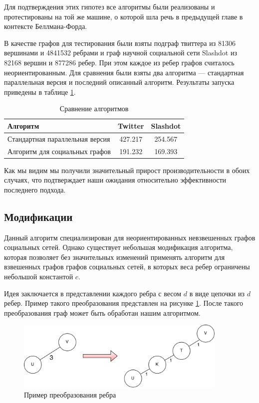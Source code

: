 Для подтверждения этих гипотез все алгоритмы были реализованы и протестированы на той же машине, о которой шла речь в предыдущей главе в контексте Беллмана-Форда.

В качестве графов для тестирования были взяты подграф твиттера из 81306 вершинами и 4841532 ребрами и граф научной социальной сети Slashdot из 82168 вершин и 877286 ребер. При этом каждое из ребер графов считалось неориентированным. Для сравнения были взяты два алгоритма --- стандартная параллельная версия и последний описанный алгоритм. Результаты запуска приведены в таблице \ref{table:algo_floyd_comparison}.   


\FloatBarrier
\begin{table}[H]
\centering

\begin{tabular}{l|c|c}  
Алгоритм & Twitter & Slashdot\\
\hline\hline
Стандартная параллельная версия & 427.217 & 254.567 \\  
Алгоритм для социальных графов & 191.232 & 169.393  \\
\hline
\end{tabular}

\caption{Сравнение алгоритмов}
\label {table:algo_floyd_comparison}
\end{table}
\FloatBarrier

Как мы видим мы получили значительный прирост производительности в обоих случаях, что подтверждает наши ожидания относительно эффективности последнего подхода.

\FloatBarrier
\subsection{Модификации}

Данный алгоритм специализирован для неориентированных невзвешенных графов социальных сетей. Однако существует небольшая модификация алгоритма, которая позволяет без значительных изменений применять алгоритм для взвешенных графов графов социальных сетей, в которых веса ребер ограничены небольшой константой $c$. 

Идея заключается в представлении каждого ребра с весом $d$ в виде цепочки из $d$ ребер. Пример такого преобразования представлен на рисунке \ref{edge_modification}. После такого преобразования граф может быть обработан нашим алгоритмом.

\FloatBarrier

\begin{figure}[h]
\caption{Пример преобразования ребра}
\label{edge_modification}
\centering
\includegraphics[width=0.9\textwidth]{img/floyd_social_modification.png}
\end{figure}
\FloatBarrier

